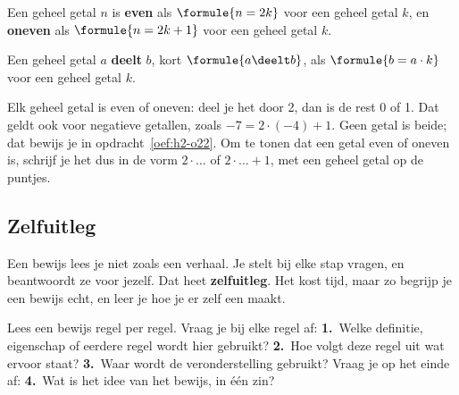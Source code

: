 \begin{theorie}
Een geheel getal $n$ is \textbf{\textcolor{accent}{even}} als $\formule{n = 2k}$ voor een geheel getal $k$, en \textbf{\textcolor{accent}{oneven}} als $\formule{n = 2k + 1}$ voor een geheel getal $k$.

\vspace{1mm}
Een geheel getal $a$ \textbf{\textcolor{accent}{deelt}} $b$, kort $\formule{a \deelt b}$, als $\formule{b = a \cdot k}$ voor een geheel getal $k$.
\end{theorie}

Elk geheel getal is even of oneven: deel je het door 2, dan is de rest 0 of 1. Dat geldt ook voor negatieve getallen, zoals $-7 = 2 \cdot (-4) + 1$. Geen getal is beide; dat bewijs je in opdracht~\ref{oef:h2-o22}. Om te tonen dat een getal even of oneven is, schrijf je het dus in de vorm $2 \cdot \ldots$ of $2 \cdot \ldots + 1$, met een geheel getal op de puntjes.


\begin{oefeningen}
\end{oefeningen}

\subsection{Zelfuitleg}

Een bewijs lees je niet zoals een verhaal. Je stelt bij elke stap vragen, en beantwoordt ze voor jezelf. Dat heet \textbf{zelfuitleg}. Het kost tijd, maar zo begrijp je een bewijs echt, en leer je hoe je er zelf een maakt.

\begin{werkwijze}
Lees een bewijs regel per regel. Vraag je bij elke regel af: \textbf{1.}~Welke definitie, eigenschap of eerdere regel wordt hier gebruikt? \textbf{2.}~Hoe volgt deze regel uit wat ervoor staat? \textbf{3.}~Waar wordt de veronderstelling gebruikt? Vraag je op het einde af: \textbf{4.}~Wat is het idee van het bewijs, in één zin?
\end{werkwijze}

